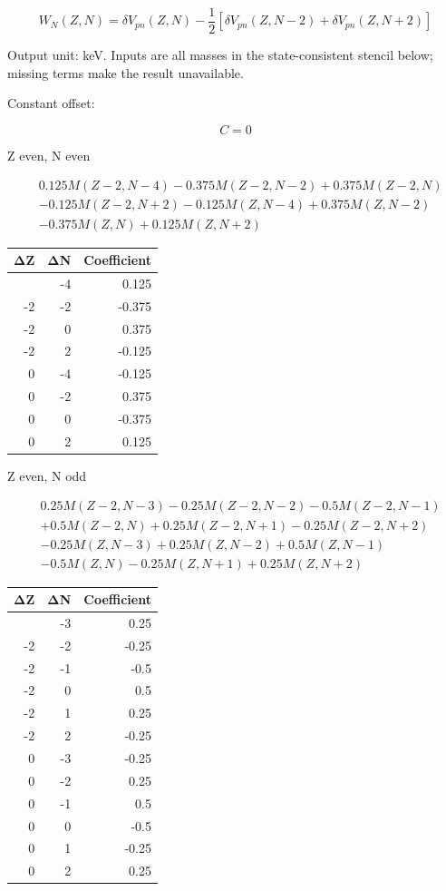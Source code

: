 \documentclass[
  11pt,
  letterpaper,
]{article}
\begin{document}
\[
W_N(Z,N)=\delta V_{pn}(Z,N)-\frac12[\delta V_{pn}(Z,N-2)+\delta V_{pn}(Z,N+2)]
\]

Output unit: keV. Inputs are all masses in the state-consistent stencil
below; missing terms make the result unavailable.

Constant offset:

\[
C=0
\]

Z even, N even

\[
\begin{aligned}
& 0.125M(Z-2,N-4)-0.375M(Z-2,N-2)+0.375M(Z-2,N) \\
& -0.125M(Z-2,N+2)-0.125M(Z,N-4)+0.375M(Z,N-2) \\
& -0.375M(Z,N)+0.125M(Z,N+2)
\end{aligned}
\]

\begin{longtable}[]{@{}rrr@{}}
\toprule\noalign{}
ΔZ & ΔN & Coefficient \\
\midrule\noalign{}
\endhead
\bottomrule\noalign{}
\endlastfoot
-2 & -4 & 0.125 \\
-2 & -2 & -0.375 \\
-2 & 0 & 0.375 \\
-2 & 2 & -0.125 \\
0 & -4 & -0.125 \\
0 & -2 & 0.375 \\
0 & 0 & -0.375 \\
0 & 2 & 0.125 \\
\end{longtable}

Z even, N odd

\[
\begin{aligned}
& 0.25M(Z-2,N-3)-0.25M(Z-2,N-2)-0.5M(Z-2,N-1) \\
& +0.5M(Z-2,N)+0.25M(Z-2,N+1)-0.25M(Z-2,N+2) \\
& -0.25M(Z,N-3)+0.25M(Z,N-2)+0.5M(Z,N-1) \\
& -0.5M(Z,N)-0.25M(Z,N+1)+0.25M(Z,N+2)
\end{aligned}
\]

\begin{longtable}[]{@{}rrr@{}}
\toprule\noalign{}
ΔZ & ΔN & Coefficient \\
\midrule\noalign{}
\endhead
\bottomrule\noalign{}
\endlastfoot
-2 & -3 & 0.25 \\
-2 & -2 & -0.25 \\
-2 & -1 & -0.5 \\
-2 & 0 & 0.5 \\
-2 & 1 & 0.25 \\
-2 & 2 & -0.25 \\
0 & -3 & -0.25 \\
0 & -2 & 0.25 \\
0 & -1 & 0.5 \\
0 & 0 & -0.5 \\
0 & 1 & -0.25 \\
0 & 2 & 0.25 \\
\end{longtable}
\end{document}

